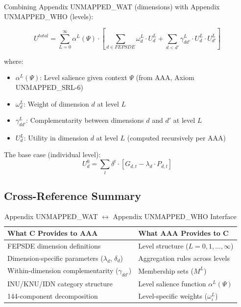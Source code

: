 \begin{tcolorbox}[colback=blue!5!white, colframe=blue!75!black, 
    title=The Complete EBF Utility Structure]

Combining Appendix UNMAPPED_WAT (dimensions) with Appendix UNMAPPED_WHO (levels):

\begin{equation}
\boxed{
U^{total} = \sum_{L=0}^{\infty} \alpha^L(\Psi) \cdot \left[ \sum_{d \in FEPSDE} \omega^L_d \cdot U^L_d + \sum_{d < d'} \gamma^L_{dd'} \cdot U^L_d \cdot U^L_{d'} \right]
}
\end{equation}

where:
\begin{itemize}[nosep]
\item $\alpha^L(\Psi)$: Level salience given context $\Psi$ (from AAA, Axiom UNMAPPED_SRL-6)
\item $\omega^L_d$: Weight of dimension $d$ at level $L$
\item $\gamma^L_{dd'}$: Complementarity between dimensions $d$ and $d'$ at level $L$
\item $U^L_d$: Utility in dimension $d$ at level $L$ (computed recursively per AAA)
\end{itemize}

The base case (individual level):
\begin{equation}
U^0_d = \sum_t \delta^t \cdot [G_{d,t} - \lambda_d \cdot P_{d,t}]
\end{equation}
\end{tcolorbox}

\subsection{Cross-Reference Summary}

\begin{table}[htbp]
\centering
\caption{Appendix UNMAPPED_WAT $\leftrightarrow$ Appendix UNMAPPED_WHO Interface}
\label{tab:app-c-aaa-interface}
\renewcommand{\arraystretch}{1.3}
\begin{tabular}{@{}p{6cm}p{6cm}@{}}
\toprule
\textbf{What C Provides to AAA} & \textbf{What AAA Provides to C} \\
\midrule
FEPSDE dimension definitions & Level structure ($L = 0, 1, ..., \infty$) \\
Dimension-specific parameters ($\lambda_d$, $\delta_d$) & Aggregation rules across levels \\
Within-dimension complementarity ($\gamma_{dd'}$) & Membership sets ($M^L$) \\
INU/KNU/IDN category structure & Level salience function $\alpha^L(\Psi)$ \\
144-component decomposition & Level-specific weights ($\omega^L_i$) \\
\bottomrule
\end{tabular}
\end{table}

